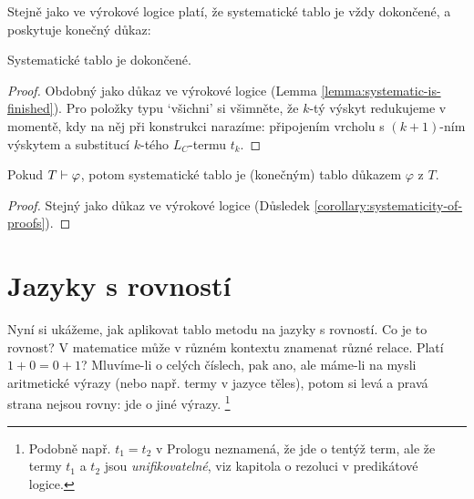 Stejně jako ve výrokové logice platí, že systematické tablo je vždy dokončené, a poskytuje konečný důkaz:

\begin{lemma}\label{lemma:systematic-is-finished-predicate}
    Systematické tablo je dokončené.
\end{lemma}
\begin{proof}
    Obdobný jako důkaz ve výrokové logice (Lemma \ref{lemma:systematic-is-finished}). Pro položky typu `všichni' si všimněte, že $k$-tý výskyt redukujeme v momentě, kdy na něj při konstrukci narazíme: připojením vrcholu s $(k+1)$-ním výskytem a substitucí $k$-tého $L_C$-termu $t_k$.
\end{proof}

\begin{corollary}\label{corollary:systematicity-of-proofs}
    Pokud $T\vdash\varphi$, potom systematické tablo je (konečným) tablo důkazem $\varphi$ z $T$.
\end{corollary}
\begin{proof}
    Stejný jako důkaz ve výrokové logice (Důsledek \ref{corollary:systematicity-of-proofs}).
\end{proof}


\section{Jazyky s rovností} \label{section:tableaux-equality}

Nyní si ukážeme, jak aplikovat tablo metodu na jazyky s rovností. Co je to rovnost? V matematice může v různém kontextu znamenat různé relace. Platí $1+0=0+1$? Mluvíme-li o celých číslech, pak ano, ale máme-li na mysli aritmetické výrazy (nebo např. termy v jazyce těles), potom si levá a pravá strana nejsou rovny: jde o jiné výrazy. \footnote{Podobně např. $t_1=t_2$ v Prologu neznamená, že jde o tentýž term, ale že termy $t_1$ a $t_2$ jsou \emph{unifikovatelné}, viz kapitola o rezoluci v predikátové logice.}

